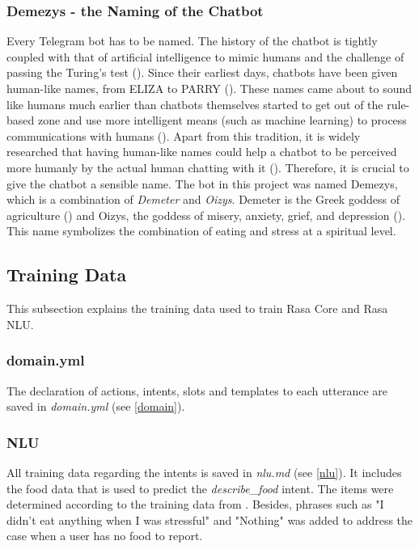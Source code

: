 \subsubsection{Demezys - the Naming of the Chatbot}
Every Telegram bot has to be named. The history of the chatbot is tightly coupled with that of artificial intelligence to mimic humans and the challenge of passing the Turing's test (\cite{38_turing}). Since their earliest days, chatbots have been given human-like names, from ELIZA to PARRY (\cite{37_early_chatbots_1}). These names came about to sound like humans much earlier than chatbots themselves started to get out of the rule-based zone and use more intelligent means (such as machine learning) to process communications with humans (\cite{36_early_chatbots}). Apart from this tradition, it is widely researched that having human-like names could help a chatbot to be perceived more humanly by the actual human chatting with it (\cite{35_chatbot_name_1, 34_chatbot_name}). Therefore, it is crucial to give the chatbot a sensible name. The bot in this project was named Demezys, which is a combination of \emph{Demeter} and \emph{Oizys}. Demeter is the Greek goddess of agriculture (\cite{39_demeter}) and Oizys, the goddess of misery, anxiety, grief, and depression (\cite{40_oizys}). This name symbolizes the combination of eating and stress at a spiritual level.

\subsection{Training Data}
This subsection explains the training data used to train Rasa Core and Rasa NLU.

\subsubsection{domain.yml}
The declaration of actions, intents, slots and templates to each utterance are saved in \emph{domain.yml} (see \autoref{domain}).

\subsubsection{NLU}
All training data regarding the intents is saved in \emph{nlu.md} (see \autoref{nlu}). It includes the food data that is used to predict the \emph{describe\_food} intent. The items were determined according to the training data from \citeauthor{17_ludwig}. Besides, phrases such as "I didn't eat anything when I was stressful" and "Nothing" was added to address the case when a user has no food to report.

